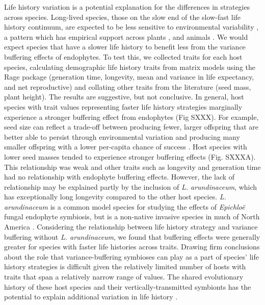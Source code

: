 \documentclass[12pt]{article}
\begin{document}
Life history variation is a potential explanation for the differences in strategies across species. 
Long-lived species, those on the slow end of the slow-fast life history continuum, are expected to be less sensitive to environmental variability \cite{murphy1968pattern}, a pattern which has empirical support across plants \cite{compagnoni2021herbaceous}, and animals \cite{le2022life}. 
We would expect species that have a slower life history to benefit less from the variance buffering effects of endophytes. 
To test this, we collected traits for each host species, calculating demographic life history traits from matrix models using the Rage package (generation time, longevity, mean and variance in life expectancy, and net reproductive)\cite{jones2022rcompadre} and collating other traits from the literature (seed mass, plant height). 
The results are suggestive, but not conclusive. 
In general, host species with trait values representing faster life history strategies marginally experience a stronger buffering effect from endophytes (Fig SXXX). 
For example, seed size can reflect a trade-off between producing fewer, larger offspring that are better able to persist through environmental variation and producing many smaller offspring with a lower per-capita chance of success \cite{rees1996evolutionary,moles2004seedling}. 
Host species with lower seed masses tended to experience stronger buffering effects (Fig. SXXXA).
This relationship was weak and other traits such as longevity and generation time had no relationship with endophyte buffering effects. 
However, the lack of relationship may be explained partly by the inclusion of \emph{L. arundinaceum}, which has exceptionally long longevity compared to the other host species. 
\emph{L. arundinaceum} is a common model species for studying the effects of \emph{Epichlo\"{e}} fungal endophyte symbiosis, but is a non-native invasive species in much of North America \cite{schardl2005epichloe}. 
Considering the relationship between life history strategy and variance buffering without \emph{L. arundinaceum}, we found that buffering effects were generally greater for species with faster life histories across traits. 
Drawing firm conclusions about the role that variance-buffering symbioses can play as a part of species' life history strategies is difficult given the relatively limited number of hosts with traits that span a relatively narrow range of values.
The shared evolutionary history of these host species and their vertically-transmitted symbionts has the potential to explain additional variation in life history \cite{jeschke2009roles}.
\end{document}
